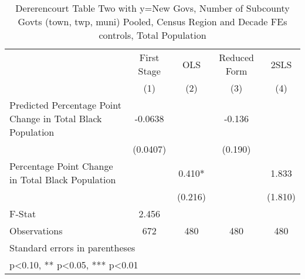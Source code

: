 \begin{table}[htbp]\centering
\def\sym#1{\ifmmode^{#1}\else\(^{#1}\)\fi}
\caption{Dererencourt Table Two with y=New Govs, Number of Subcounty Govts (town, twp, muni)  Pooled, Census Region and Decade FEs controls, Total Population}
\begin{tabular}{l*{4}{c}}
\toprule
                    & First Stage   &         OLS   &Reduced Form   &        2SLS   \\
                    &\multicolumn{1}{c}{(1)}   &\multicolumn{1}{c}{(2)}   &\multicolumn{1}{c}{(3)}   &\multicolumn{1}{c}{(4)}   \\
\midrule
Predicted Percentage Point Change in Total Black Population&     -0.0638   &               &      -0.136   &               \\
                    &    (0.0407)   &               &     (0.190)   &               \\
\addlinespace
Percentage Point Change in Total Black Population&               &       0.410*  &               &       1.833   \\
                    &               &     (0.216)   &               &     (1.810)   \\
\midrule
F-Stat              &       2.456   &               &               &               \\
Observations        &         672   &         480   &         480   &         480   \\
\bottomrule
\multicolumn{5}{l}{\footnotesize Standard errors in parentheses}\\
\multicolumn{5}{l}{\footnotesize * p<0.10, ** p<0.05, *** p<0.01}\\
\end{tabular}
\end{table}
